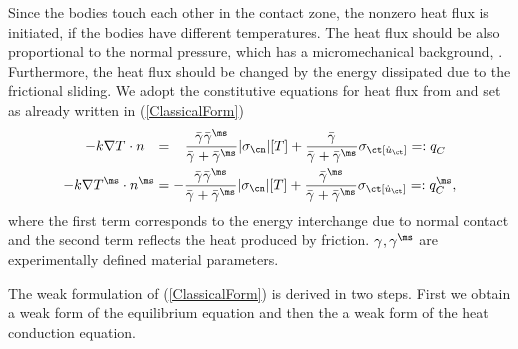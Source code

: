 Since the bodies touch each other in the contact zone, the nonzero heat flux is initiated, if the bodies have different temperatures. The heat flux should be also proportional to the normal pressure, which has a micromechanical background, \cite{WrMi94}. Furthermore, the heat flux should be changed by the energy dissipated due to the frictional sliding. We adopt the constitutive equations for heat flux from \cite{JoKl93} and set as already written in (\ref{ClassicalForm})
\begin{align*}
    -k\nabla T^{\sl} \cdot n^{\sl} \,\,\,\,
      &= \,\,\,\,\, \dfrac{\bar{\gamma}^{\sl} \bar{\gamma}^{\ms}}{\bar{\gamma}^{\sl} + \bar{\gamma}^{\ms}} |\sigma_\cn| [T] 
        + \dfrac{\bar{\gamma}^{\sl}}{\bar{\gamma}^{\sl} + \bar{\gamma}^{\ms}} \sigma_\ct [\dot u_\ct]=:q^{\sl}_{C} \\
    -k\nabla T^{\ms} \cdot n^{\ms} 
      &= - \dfrac{\bar{\gamma}^{\sl} \bar{\gamma}^{\ms}}{\bar{\gamma}^{\sl} + \bar{\gamma}^{\ms}} |\sigma_\cn| [T] 
        + \dfrac{\bar{\gamma}^{\ms}}{\bar{\gamma}^{\sl} + \bar{\gamma}^{\ms}} \sigma_\ct [\dot u_\ct]=:q^{\ms}_{C},
\end{align*}
where the first term corresponds to the energy interchange due to normal contact and the second term reflects the heat produced by friction. $\gamma^{\sl}, \gamma^{\ms}$ are experimentally defined material parameters.

The weak formulation of (\ref{ClassicalForm}) is derived in two steps. First we obtain a weak form of the equilibrium equation and then the a weak form of the heat conduction equation. 

